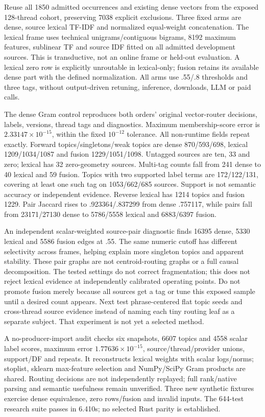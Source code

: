 \documentclass[11pt]{article}
\begin{document}
Reuse all 1850 admitted occurrences and existing dense vectors from the exposed
128-thread cohort, preserving 7038 explicit exclusions. Three fixed arms are
dense, source lexical TF-IDF and normalized equal-weight concatenation. The
lexical frame uses technical unigrams/contiguous bigrams, 8192 maximum features,
sublinear TF and source IDF fitted on all admitted development sources. This is
transductive, not an online frame or held-out evaluation. A lexical zero row is
explicitly unroutable in lexical-only; fusion retains its available dense part
with the defined normalization. All arms use .55/.8 thresholds and three tags,
without output-driven retuning, inference, downloads, LLM or paid calls.

The dense Gram control reproduces both orders' original vector-router decisions,
labels, versions, thread tags and diagnostics. Maximum membership-score error is
$2.33147\times10^{-15}$, within the fixed $10^{-12}$ tolerance. All non-runtime
fields repeat exactly. Forward topics/singletons/weak topics are dense
870/593/698, lexical 1209/1034/1087 and fusion 1229/1051/1098.
Untagged sources are ten, 33 and zero; lexical has 32 zero-geometry sources.
Multi-tag counts fall from 241 dense to 40 lexical and 59 fusion. Topics with
two supported label terms are 172/122/131, covering at least one such tag on
1053/662/685 sources. Support is not semantic accuracy or independent evidence.
Reverse lexical has 1214 topics and fusion 1229. Pair Jaccard rises to
.923364/.837299 from dense .757117, while pairs fall from 23171/27130 dense
to 5786/5558 lexical and 6883/6397 fusion.

An independent scalar-weighted source-pair diagnostic finds 16395 dense,
5330 lexical and 5586 fusion edges at .55. The same numeric cutoff has different
selectivity across frames, helping explain more singleton topics and apparent
stability. These pair graphs are not centroid-routing graphs or a full causal
decomposition. The tested settings do not correct fragmentation; this does not
reject lexical evidence at independently calibrated operating points. Do not
promote fusion merely because all sources get a tag or tune this exposed sample
until a desired count appears. Next test phrase-centered flat topic seeds and
cross-thread source evidence instead of naming each tiny routing leaf as a
separate subject. That experiment is not yet a selected method.

A no-producer-import audit checks six snapshots, 6607 topics and 4558 scalar
label scores, maximum error $1.77636\times10^{-15}$, source/thread/provider
unions, support/DF and repeats. It reconstructs lexical weights with scalar
logs/norms; stoplist, sklearn max-feature selection and NumPy/SciPy Gram products
are shared. Routing decisions are not independently replayed; full rank/native
parsing and semantic usefulness remain unverified. Three new synthetic fixtures
exercise dense equivalence, zero rows/fusion and invalid inputs. The 644-test
research suite passes in 6.410s; no selected Rust parity is established.
\end{document}
